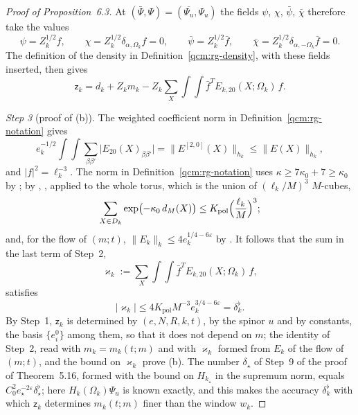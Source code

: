 \documentclass[11pt,letterpaper,reqno]{amsart}
\theoremstyle{definition}
\begin{document}
\begin{proof}[Proof of Proposition~6.3]
At $(\bar\Psi,\Psi)=(\overline{\Psi_u},\Psi_u)$ the fields $\psi$, $\chi$, $\bar\psi$, $\bar\chi$ therefore take the values
\begin{equation*}
\psi=Z_k^{1/2}f,\qquad\chi=Z_k^{1/2}\delta_{\alpha,\Omega_k}f=0,\qquad\bar\psi=Z_k^{1/2}\bar f,\qquad\bar\chi=Z_k^{1/2}\delta_{\alpha,-\Omega_k}\bar f=0.
\end{equation*}
The definition of the density in Definition~\ref{qcm:rg-density}, with these fields inserted, then gives
\begin{equation*}
\mathsf z_k=d_k+Z_km_k-Z_k\sum_X\int\!\!\int\bar f^{T}E_{k,20}(X;\Omega_k)\,f .
\end{equation*}

\emph{Step 3} (proof of (b)).
The weighted coefficient norm in Definition~\ref{qcm:rg-notation} gives
\begin{equation*}
e_k^{-1/2}\int\!\!\int\sum_{\beta\beta'}\bigl|E_{20}(X)_{\beta\beta'}\bigr|=\bigl\|E^{[2,0]}(X)\bigr\|_{h_k}\le\|E(X)\|_{h_k},
\end{equation*}
and $|f|^2=\ell_k^{-3}$.
The norm in Definition~\ref{qcm:rg-notation} uses $\kappa\ge7\kappa_0+7\ge\kappa_0$ by \cite[Proposition~24.1]{QEDConstruction};
by \cite[equation~(A.3)]{QEDConstruction}, \cite[equation~(A.3)]{QEDConstruction}, applied to the whole torus, which is the union of $(\ell_k/M)^3$ $M$-cubes,
\begin{equation*}
\sum_{X\in D_k}\exp\bigl(-\kappa_0\,d_M(X)\bigr)\le K_{\mathrm{pol}}\Bigl(\frac{\ell_k}M\Bigr)^3 ;
\end{equation*}
and, for the flow of $(m;t)$, $\|E_k\|_k\le4e_k^{1/4-6\varepsilon}$ by \cite[Proposition~16.2]{QEDConstruction}.
It follows that the sum in the last term of Step~2,
\begin{equation*}
\varkappa_k:=\sum_X\int\!\!\int\bar f^{T}E_{k,20}(X;\Omega_k)\,f,
\end{equation*}
satisfies
\begin{equation*}
|\varkappa_k|\le4K_{\mathrm{pol}}M^{-3}e_k^{3/4-6\varepsilon}=\delta^\flat_k .
\end{equation*}
By Step~1, $\mathsf z_k$ is determined by $(e,N,R,k,t)$, by the spinor $u$ and by constants, the basis $\{e_i^0\}$ among them, so that it does not depend on $m$;
the identity of Step~2, read with $m_k=m_k(t;m)$ and with $\varkappa_k$ formed from $E_k$ of the flow of $(m;t)$, and the bound on $\varkappa_k$ prove (b).
The number $\delta_\star$ of Step~9 of the proof of Theorem~5.16, formed with the bound on $H_{k_\star}$ in the supremum norm, equals $C_0^2e_\star^{-2\varepsilon}\delta^\flat_\star$;
here $H_k(\Omega_k)\Psi_u$ is known exactly, and this makes the accuracy $\delta^\flat_k$ with which $\mathsf z_k$ determines $m_k(t;m)$ finer than the window $w_k$.


\end{proof}
\end{document}
